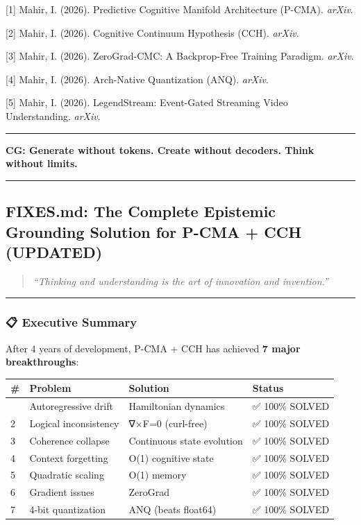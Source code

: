 \documentclass[
  11pt,
  a4paper,
]{article}
\begin{document}
{[}1{]} Mahir, I. (2026). Predictive Cognitive Manifold Architecture
(P-CMA). \emph{arXiv}.

{[}2{]} Mahir, I. (2026). Cognitive Continuum Hypothesis (CCH).
\emph{arXiv}.

{[}3{]} Mahir, I. (2026). ZeroGrad-CMC: A Backprop-Free Training
Paradigm. \emph{arXiv}.

{[}4{]} Mahir, I. (2026). Arch-Native Quantization (ANQ). \emph{arXiv}.

{[}5{]} Mahir, I. (2026). LegendStream: Event-Gated Streaming Video
Understanding. \emph{arXiv}.

\begin{center}\rule{0.5\linewidth}{0.5pt}\end{center}

\textbf{CG: Generate without tokens. Create without decoders. Think
without limits.}

\newpage

\begin{center}\rule{0.5\linewidth}{0.5pt}\end{center}

\subsection{FIXES.md: The Complete Epistemic Grounding Solution for
P-CMA + CCH
(UPDATED)}\label{fixes.md-the-complete-epistemic-grounding-solution-for-p-cma-cch-updated}

\begin{quote}
\emph{``Thinking and understanding is the art of innovation and
invention.''}
\end{quote}

\begin{center}\rule{0.5\linewidth}{0.5pt}\end{center}

\subsubsection{📋 Executive Summary}\label{executive-summary}

After 4 years of development, P-CMA + CCH has achieved \textbf{7 major
breakthroughs}:

\begin{longtable}[]{@{}llll@{}}
\toprule\noalign{}
\# & Problem & Solution & Status \\
\midrule\noalign{}
\endhead
\bottomrule\noalign{}
\endlastfoot
1 & Autoregressive drift & Hamiltonian dynamics & ✅ 100\% SOLVED \\
2 & Logical inconsistency & ∇×F=0 (curl-free) & ✅ 100\% SOLVED \\
3 & Coherence collapse & Continuous state evolution & ✅ 100\% SOLVED \\
4 & Context forgetting & O(1) cognitive state & ✅ 100\% SOLVED \\
5 & Quadratic scaling & O(1) memory & ✅ 100\% SOLVED \\
6 & Gradient issues & ZeroGrad & ✅ 100\% SOLVED \\
7 & 4-bit quantization & ANQ (beats float64) & ✅ 100\% SOLVED \\
\end{longtable}
\end{document}
